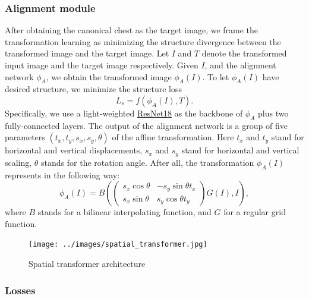 \documentclass{article}
\begin{document}
\subsubsection{Alignment module}
After obtaining the canonical chest as the target image, we frame the transformation
 learning as minimizing the structure divergence between the transformed image and
 the target image. Let $ I $ and $ T $ denote the transformed input image and the 
 target image respectively. Given $ I $, and the alignment network $ \phi_A $, we 
 obtain the transformed image $ \phi_A(I) $. To let $ \phi_A(I) $ have desired 
 structure, we minimize the structure loss 
\begin{equation}
    L_s = f(\phi_A(I), T).
\end{equation}
Specifically, we use a light-weighted \href{https://pytorch.org/vision/master/models/generated/torchvision.models.resnet18.html#torchvision.models.resnet18}{ResNet18} 
 as the backbone of $\phi_A$ plus two fully-connected layers. The output of the alignment network is a group of five 
 parameters $(t_x, t_y, s_x, s_y, \theta)$ of the affine transformation. Here $t_x$ 
 and $t_y$  stand for horizontal and vertical displacements, $s_x$ and $s_y$ stand 
 for horizontal and vertical scaling, $\theta$ stands for the rotation angle. After 
 all, the transformation $\phi_A(I)$ represents in the following way:
\begin{equation}
    \phi_A(I) = B \left(
    \begin{pmatrix}
        s_x \cos \theta & -s_y \sin \theta t_x \\
        s_x \sin \theta & s_y \cos \theta t_y 
    \end{pmatrix} 
    G(I) , I \right),
\end{equation}
where $ B $ stands for a bilinear interpolating function, and $ G $ for a regular 
 grid function.

 \begin{figure}[ht]\label{spatial_transformer}
    \vskip 0.2in
    \begin{center}
    \centerline{\texttt{[image: ../images/spatial\_transformer.jpg]}}
    \caption{Spatial transformer architecture}
    \end{center}
    \vskip -0.2in
\end{figure}

\subsubsection{Losses}
\end{document}
